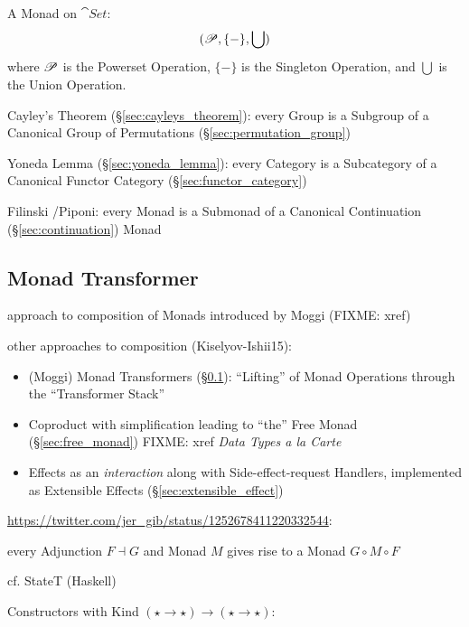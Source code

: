 A Monad on $\cat{Set}$:
\[
  (\mathscr{P}, \{-\}, \bigcup)
\]
where $\mathscr{P}$ is the Powerset Operation, $\{-\}$ is the
Singleton Operation, and $\bigcup$ is the Union Operation.


\asterism


Cayley's Theorem (\S\ref{sec:cayleys_theorem}): every Group is a
Subgroup of a Canonical Group of Permutations
(\S\ref{sec:permutation_group})

Yoneda Lemma (\S\ref{sec:yoneda_lemma}): every Category is a
Subcategory of a Canonical Functor Category
(\S\ref{sec:functor_category})

Filinski \cite{filinski99}/Piponi: every Monad is a Submonad of a
Canonical Continuation (\S\ref{sec:continuation}) Monad



\subsection{Monad Transformer}\label{sec:monad_transformer}

approach to composition of Monads introduced by Moggi (FIXME: xref)

other approaches to composition (Kiselyov-Ishii15):
\begin{itemize}
  \item (Moggi) Monad Transformers (\S\ref{sec:monad_transformer}): ``Lifting''
of Monad Operations through the ``Transformer Stack''
  \item Coproduct with simplification leading to ``the'' Free Monad
    (\S\ref{sec:free_monad}) FIXME: xref \emph{Data Types a la Carte}
  \item Effects as an \emph{interaction} along with Side-effect-request
    Handlers, implemented as Extensible Effects (\S\ref{sec:extensible_effect})
\end{itemize}

\url{https://twitter.com/jer_gib/status/1252678411220332544}:

every Adjunction $F \dashv G$ and Monad $M$ gives rise to a Monad
$G \circ M \circ F$

cf. StateT (Haskell)


Constructors with Kind $(\star \rightarrow \star) \rightarrow (\star
\rightarrow \star)$:

